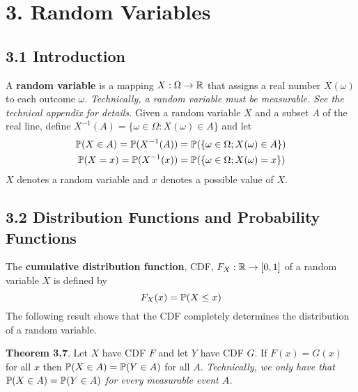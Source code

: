 \section*{3. Random Variables}\label{random-variables}

\subsection*{3.1 Introduction}\label{introduction:RVs}
A \textbf{random variable} is a mapping \(X : \Omega \rightarrow \mathbb{R}\) that assigns a real number \(X(\omega)\) to each outcome \(\omega\).
\emph{Technically, a random variable must be measurable. See the technical appendix for details.}
Given a random variable \(X\) and a subset \(A\) of the real line, define \(X^{-1}(A) = \{ \omega \in \Omega : X(\omega) \in A \}\) and let
\begin{align*}
\operatorname{\mathbb{P}}(X \in A) = \operatorname{\mathbb{P}}(X^{-1}(A)) 
&= \operatorname{\mathbb{P}}(\{ \omega \in \Omega; X(\omega) \in A \}) 
\\
\operatorname{\mathbb{P}}(X = x) = \operatorname{\mathbb{P}}(X^{-1}(x)) 
&= \operatorname{\mathbb{P}}(\{ \omega \in \Omega; X(\omega) = x \})
\end{align*}
\(X\) denotes a random variable and \(x\) denotes a possible value of \(X\).

\subsection*{3.2 Distribution Functions and Probability Functions}\label{distribution:functions:probability}
The \textbf{cumulative distribution function}, CDF, \(F_X : \mathbb{R} \rightarrow [0, 1]\) of a random variable \(X\) is defined by
\[
F_X(x) = \operatorname{\mathbb{P}}(X \leq x) 
\]
The following result shows that the CDF completely determines the distribution of a random variable.

\textbf{Theorem 3.7}. Let \(X\) have CDF \(F\) and let \(Y\) have CDF \(G\). If \(F(x) = G(x)\) for all \(x\) then \(\operatorname{\mathbb{P}}(X \in A) = \operatorname{\mathbb{P}}(Y \in A)\) for all \(A\).
\emph{Technically, we only have that \(\operatorname{\mathbb{P}}(X \in A) = \operatorname{\mathbb{P}}(Y \in A)\) for every measurable event \(A\).}

